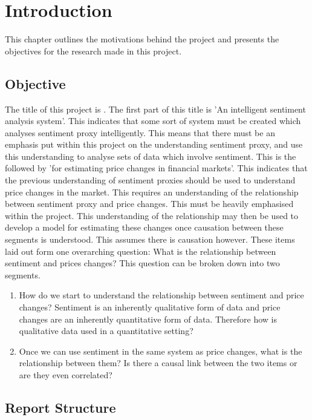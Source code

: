 
\chapter{Introduction}

This chapter outlines the motivations behind the project and presents the objectives for the research made in this project.

\section{Objective}

The title of this project is \thesistitle. The first part of this title is 'An intelligent sentiment analysis system'. This indicates that some sort of system must be created which analyses sentiment proxy intelligently. This means that there must be an emphasis put within this project on the understanding sentiment proxy, and use this understanding to analyse sets of data which involve sentiment. This is the followed by 'for estimating price changes in financial markets'. This indicates that the previous understanding of sentiment proxies should be used to understand price changes in the market. This requires an understanding of the relationship between sentiment proxy and price changes. This must be heavily emphasised within the project. This understanding of the relationship may then be used to develop a model for estimating these changes once causation between these segments is understood. This assumes there is causation however. These items laid out form one overarching question: What is the relationship between sentiment and prices changes? This question can be broken down into two segments.
\begin{enumerate}
    \item How do we start to understand the relationship between sentiment and price changes? Sentiment is an inherently qualitative form of data and price changes are an inherently quantitative form of data. Therefore how is qualitative data used in a quantitative setting?
    \item Once we can use sentiment in the same system as price changes, what is the relationship between them? Is there a causal link between the two items or are they even correlated?
\end{enumerate}

\section{Report Structure}

